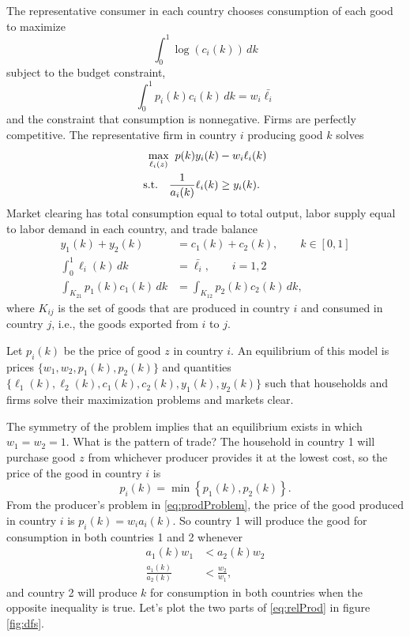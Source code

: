 \documentclass[11pt, pdftex]{article}
\begin{document}
The representative consumer in each country chooses consumption of each good to maximize
\begin{equation}
  \int_0^1 \!\! \log \left(c_i\left(k\right)\right) \, dk
\end{equation}
subject to the budget constraint,
\begin{equation}
  \int_0^1 \!\! p_i(k) c_i(k) \, dk = w_i \bar{\ell_i}
\end{equation}
and the constraint that consumption is nonnegative.  Firms are perfectly competitive.  The representative firm in country $i$ producing good $k$ solves
\begin{align}\label{eq:prodProblem}
  \max_ {\ell_i(z)} & \;\; p(k)y_i(k) - w_i \ell_i(k) \\
  \text{s.t.} \quad & \frac{1}{a_i(k)} \ell_i(k) \geq y_i(k). \notag
\end{align}
Market clearing has total consumption equal to total output,  labor supply equal to labor demand in each country, and trade balance
\begin{align}
  y_1(k) + y_2(k) & = c_1(k)+c_2(k), \quad \quad k \in [0,1] \\
  \int_0^1 \! \! \ell_i(k) \, dk & = \bar{\ell_i},\quad \quad i = 1,2\\
  \int_{K_{21}} \!\! \! p_1(k)c_1(k)\,dk&=\int_{K_{12}} \! \!\! p_2(k)c_2(k) \,dk, \label{eq:tb}
\end{align}
where $K_{ij}$ is the set of goods that are produced in country $i$ and consumed in country $j$, i.e., the goods exported from $i$ to $j$.

Let $p_i(k)$ be the price of good $z$ in country $i$.  An equilibrium of this model is prices $\{w_1, w_2, p_1(k), p_2(k)\}$ and quantities $\{\ell_1(k), \ell_2(k), c_1(k), c_2(k), y_1(k), y_2(k) \}$ such that households and firms solve their maximization problems and markets clear.

The symmetry of the problem implies that an equilibrium exists in which $w_1=w_2=1$.  What is the pattern of trade?  The household in country 1 will purchase good $z$ from whichever producer provides it at the lowest cost, so the price of the good in country $i$ is
\begin{equation} \label{eq:dfsMin}
  p_i(k) = \min \left\{p_1(k),p_2(k) \right\}.
\end{equation}
From the producer's problem in \eqref{eq:prodProblem}, the price of the good produced in country $i$ is $p_i(k) = w_i a_i(k)$.  So country 1 will produce the good for consumption in both countries 1 and 2 whenever
\begin{align}
  a_1(k)w_1 & < a_2(k)w_2 \\
  \frac{a_1(k)}{a_2(k)} & < \frac{w_2}{w_1}, \label{eq:relProd}
\end{align}
and country 2 will produce $k$ for consumption in both countries when the opposite inequality is true. Let's plot the two parts of \eqref{eq:relProd} in figure \ref{fig:dfs}.
\end{document}
